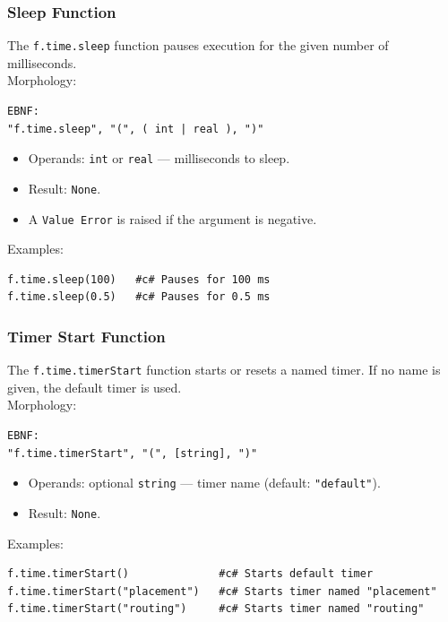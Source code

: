 \subsubsection{Sleep Function}
The \texttt{f.time.sleep} function pauses execution for the given number of milliseconds. \\
Morphology:
\begin{verbatim}
EBNF:
"f.time.sleep", "(", ( int | real ), ")"
\end{verbatim}
\begin{itemize}
\item Operands: \texttt{int} or \texttt{real} --- milliseconds to sleep.
\item Result: \texttt{None}.
\item A \texttt{Value Error} is raised if the argument is negative.
\end{itemize}
Examples:
\begin{verbatim}
f.time.sleep(100)   #c# Pauses for 100 ms
f.time.sleep(0.5)   #c# Pauses for 0.5 ms
\end{verbatim}

\subsubsection{Timer Start Function}
The \texttt{f.time.timerStart} function starts or resets a named timer. If no name is given, the default timer is used. \\
Morphology:
\begin{verbatim}
EBNF:
"f.time.timerStart", "(", [string], ")"
\end{verbatim}
\begin{itemize}
\item Operands: optional \texttt{string} --- timer name (default: \texttt{"default"}).
\item Result: \texttt{None}.
\end{itemize}
Examples:
\begin{verbatim}
f.time.timerStart()              #c# Starts default timer
f.time.timerStart("placement")   #c# Starts timer named "placement"
f.time.timerStart("routing")     #c# Starts timer named "routing"
\end{verbatim}

